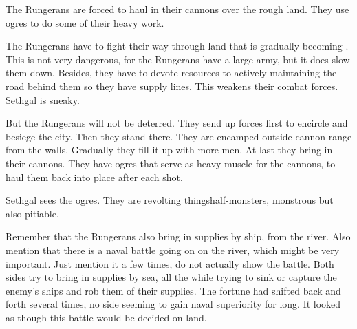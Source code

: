 \begin{changes}
    The Rungerans are forced to haul in their cannons over the rough land. 
    They use \nephil ogres to do some of their heavy work.

    The Rungerans have to fight their way through land that is gradually becoming \wylde. 
    This is not very dangerous, for the Rungerans have a large army, but it does slow them down.
    Besides, they have to devote resources to actively maintaining the road behind them so they have supply lines. 
    This weakens their combat forces. 
    Sethgal is sneaky. 

    But the Rungerans will not be deterred. 
    They send up forces first to encircle and besiege the city.
    Then they stand there. 
    They are encamped outside cannon range from the walls. 
    Gradually they fill it up with more men. 
    At last they bring in their cannons. 
    They have ogres that serve as heavy muscle for the cannons, to haul them back into place after each shot. 
    
    Sethgal sees the ogres. 
    They are revolting things\dash half-\human monsters, monstrous but also pitiable. 
    
    Remember that the Rungerans also bring in supplies by ship, from the river. 
    Also mention that there is a naval battle going on on the river, which might be very important. 
    Just mention it a few times, do not actually show the battle.
    Both sides try to bring in supplies by sea, all the while trying to sink or capture the enemy's ships and rob them of their supplies. 
    The fortune had shifted back and forth several times, no side seeming to gain naval superiority for long.
    It looked as though this battle would be decided on land. 
\end{changes}









